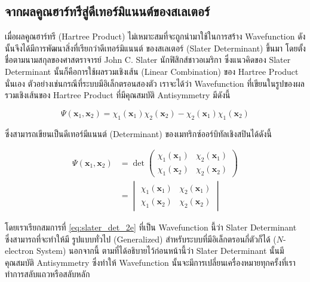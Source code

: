 \subsection{จากผลคูณฮาร์ทรีสู่ดีเทอร์มิแนนต์ของสเลเตอร์}
\label{ssec:hartree_prod_to_slater_deter}

เมื่อผลคูณฮาร์ทรี (Hartree Product) ไม่เหมาะสมที่จะถูกนำมาใช้ในการสร้าง Wavefunction ดังนั้นจึงได้มีการพัฒนาสิ่งที่เรียกว่าดีเทอร์มิแนนต์%
ของสเลเตอร์ (Slater Determinant) ขึ้นมา โดยตั้งชื่อตามนามสกุลของศาสตราจารย์ John C. Slater นักฟิสิกส์ชาวอเมริกา ซึ่งแนวคิดของ
Slater Determinant นั้นก็คือการใช้ผลรวมเชิงเส้น (Linear Combination) ของ Hartree Product นั่นเอง\autocite{slater1929} 
ตัวอย่างเช่นกรณีที่ระบบมีอิเล็กตรอนสองตัว เราจะได้ว่า Wavefunction ที่เขียนในรูปของผลรวมเชิงเส้นของ Hartree Product ที่มีคุณสมบัติ 
Antisymmetry มีดังนี้

\begin{equation}\label{eq:lin_com_hartree_prod}
    \Psi(\bm{x}_{1}, \bm{x}_{2}) = \chi_{1}(\bm{x}_{1})\chi_{2}(\bm{x}_{2}) - 
    \chi_{2}(\bm{x}_{1})\chi_{1}(\bm{x}_{2})
\end{equation}

\noindent ซึ่งสามารถเขียนเป็นดีเทอร์มีแนนต์ (Determinant) ของเมทริกซ์ออร์บิทัลเชิงสปินได้ดังนี้

\begin{align}\label{eq:slater_det_2e}
    \Psi(\bm{x}_{1}, \bm{x}_{2}) &= 
    \det \begin{pmatrix}
        \chi_{1}(\bm{x}_{1}) & \chi_{2}(\bm{x}_{1}) \\
        \chi_{1}(\bm{x}_{2}) & \chi_{2}(\bm{x}_{2})
    \end{pmatrix} \nonumber \\
    &= \begin{vmatrix}
        \chi_{1}(\bm{x}_{1}) & \chi_{2}(\bm{x}_{1}) \\
        \chi_{1}(\bm{x}_{2}) & \chi_{2}(\bm{x}_{2})
    \end{vmatrix}
\end{align}

\noindent โดยเราเรียกสมการที่ \ref{eq:slater_det_2e} ที่เป็น Wavefunction นี้ว่า Slater Determinant ซึ่งสามารถที่จะทำให้มี%
รูปแบบทั่วไป (Generalized) สำหรับระบบที่มีอิเล็กตรอนกี่ตัวก็ได้ ($N$-electron System) นอกจากนี้ ตามที่ได้อธิบายไว้ก่อนหน้านี้ว่า Slater 
Determinant นั้นมีคุณสมบัติ Antisymmetry ซึ่งทำให้ Wavefunction นั้นจะมีการเปลี่ยนเครื่องหมายทุกครั้งที่เราทำการสลับแถวหรือสลับหลัก


